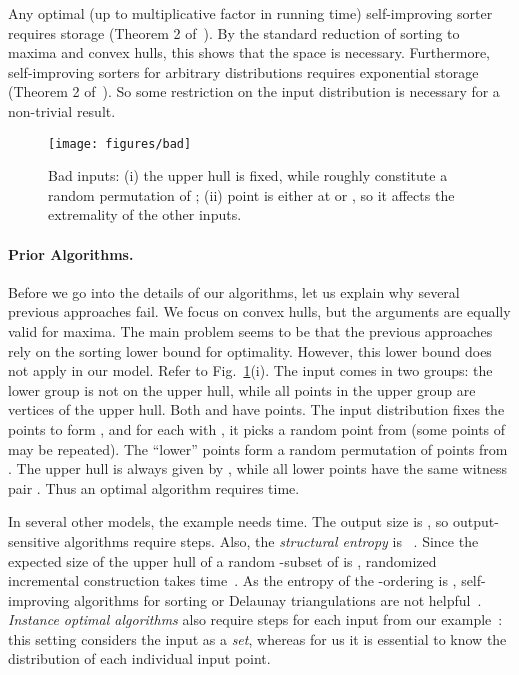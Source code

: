 \documentclass[letterpaper,11pt]{article}
\begin{document}
Any optimal (up to multiplicative factor  in running time)
self-improving sorter requires  storage (Theorem 2 of~\cite{AilonCCLMS11}).
By the standard reduction of sorting to maxima and convex hulls, this shows that 
the  space is necessary.
Furthermore, self-improving sorters for arbitrary distributions requires exponential storage (Theorem 2 of~\cite{AilonCCLMS11}). So some 
restriction on the input distribution is necessary for a non-trivial result.

\begin{figure}
  \centering
  \texttt{[image: figures/bad]}

  \caption{Bad inputs: (i) the 
    upper hull  is fixed, while 
     roughly 
    constitute a random permutation of ; 
    (ii) point  is either at  
    or , so it affects the 
    extremality of the other inputs.}
  \label{fig:bad}
\end{figure}

\paragraph{Prior Algorithms.}
Before we go into the details of
our algorithms, let us explain why
several previous approaches fail.
We focus 
on convex hulls, but the arguments
are equally valid for maxima.
The main problem seems to be
that the previous approaches rely
on the sorting lower bound for 
optimality. However, this 
lower bound does not apply 
in our model.  Refer to 
Fig.~\ref{fig:bad}(i). 
The input comes in two groups: 
the lower group  is not on 
the upper hull, while all points
in the upper group 
are vertices of the upper hull. 
Both  and  have
 points. The input distribution 
 fixes the points 
 to form , 
and for each  with , 
it picks a random point from  
(some points of  may be repeated). 
The ``lower'' points form a random 
permutation of  points from . 
The upper hull is always given by , 
while all lower points have the same
witness pair . Thus 
an optimal algorithm requires  time.

In several other models, the 
example needs  
time. The output size is , so 
output-sensitive algorithms require 
 steps. Also, 
the \emph{structural entropy}
is ~\cite{Barbay}. 
Since the expected size of the
upper hull of a random -subset 
of  is , 
randomized incremental construction 
takes  time~\cite{CS89}. 
As the entropy of the 
-ordering is , 
self-improving algorithms
for sorting or Delaunay
triangulations are not
helpful~\cite{AilonCCLMS11}.
\emph{Instance optimal algorithms}
also require 
steps for each input from our 
example~\cite{AfshaniBC09}: 
this setting 
considers the input as a \emph{set}, 
whereas for us
it is essential to know the distribution of
each individual input point.
\end{document}
